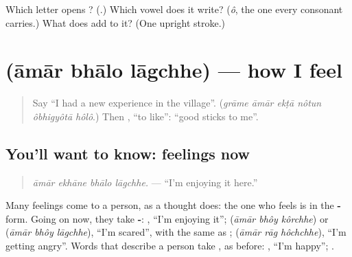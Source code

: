 \begin{tcolorbox}[breakable,colback=teal!4,colframe=teal!35!black,title={Before you move on}]
Which letter opens \textbf{}? (\textbf{}.) Which vowel does it write? (\emph{ô}, the one every consonant carries.) What does \textbf{} add to it? (One upright stroke.)
\end{tcolorbox}
\section[\texorpdfstring{\bn{আমার} \bn{ভালো} \bn{লাগছে} (āmār bhālo lāgchhe)}{আমার ভালো লাগছে (āmār bhālo lāgchhe)}]{   (āmār bhālo lāgchhe) — how I feel}

\label{lesson:BN-C272-bhalo-lagchhe}



\begin{quote}
Say \textquotedblleft{}I had a new experience in the village\textquotedblright{}. (\emph{grāme āmār ekṭā nôtun ôbhigyôtā hôlô}.) Then \textbf{ }, \textquotedblleft{}to like\textquotedblright{}: \textquotedblleft{}good sticks to me\textquotedblright{}.
\end{quote}

\subsection*{You'll want to know: feelings now}
\begin{quote}
\textbf{   }
\end{quote}

\begin{quote}
\emph{āmār ekhāne bhālo lāgchhe.} — \textquotedblleft{}I'm enjoying it here.\textquotedblright{}
\end{quote}

Many feelings come to a person, as a thought does: the one who feels is in the \textbf{-} form. Going on now, they take \textbf{-}: \textbf{  }, \textquotedblleft{}I'm enjoying it\textquotedblright{}; \textbf{  } (\emph{āmār bhôy kôrchhe}) or \textbf{  } (\emph{āmār bhôy lāgchhe}), \textquotedblleft{}I'm scared\textquotedblright{}, with the same \textbf{} as \textbf{ }; \textbf{  } (\emph{āmār rāg hôchchhe}), \textquotedblleft{}I'm getting angry\textquotedblright{}. Words that describe a person take \textbf{}, as before: \textbf{ }, \textquotedblleft{}I'm happy\textquotedblright{}; \textbf{ }.

